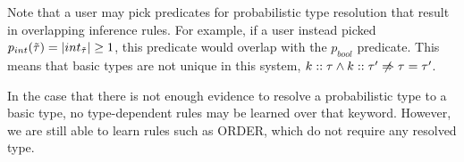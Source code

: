 Note that a user may pick predicates for probabilistic type resolution that result in overlapping inference rules.
For example, if a user instead picked $p_{int}(\tilde{\tau})= |int_{\tilde{\tau}}| \geq 1$, this predicate would overlap with the $p_{bool}$ predicate.
This means that basic types are not unique in this system, \ie $k::\tau \land k::\tau' \centernot\implies \tau = \tau'$.

In the case that there is not enough evidence to resolve a probabilistic type to a basic type, no type-dependent rules may be learned over that keyword.
However, we are still able to learn rules such as {\scriptsize ORDER}, which do not require any resolved type. 



